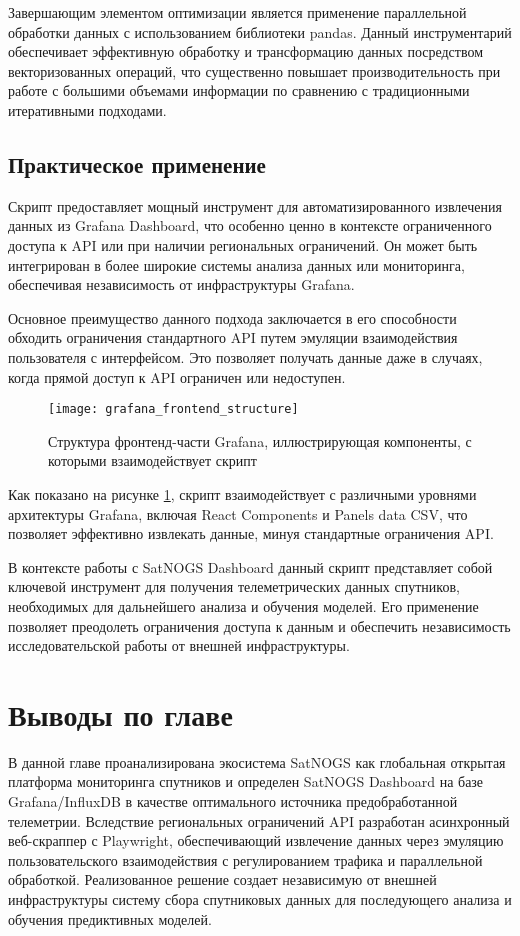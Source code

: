 Завершающим элементом оптимизации является применение параллельной обработки
данных с использованием библиотеки pandas. Данный инструментарий обеспечивает
эффективную обработку и трансформацию данных посредством векторизованных
операций, что существенно повышает производительность при работе с большими
объемами информации по сравнению с традиционными итеративными подходами.

\subsection{Практическое применение}

Скрипт предоставляет мощный инструмент для автоматизированного извлечения
данных из Grafana Dashboard, что особенно ценно в контексте ограниченного
доступа к API или при наличии региональных ограничений. Он может быть
интегрирован в более широкие системы анализа данных или мониторинга,
обеспечивая независимость от инфраструктуры Grafana.

Основное преимущество данного подхода заключается в его способности обходить
ограничения стандартного API путем эмуляции взаимодействия пользователя с
интерфейсом. Это позволяет получать данные даже в случаях, когда прямой
доступ к API ограничен или недоступен.

\begin{figure}[H]
	\centering
	\texttt{[image: grafana\_frontend\_structure]}
	\caption{Структура фронтенд-части Grafana, иллюстрирующая компоненты, с которыми взаимодействует скрипт}
	\label{fig:grafana_frontend_structure_advanced}
\end{figure}

Как показано на рисунке \ref{fig:grafana_frontend_structure_advanced}, скрипт
взаимодействует с различными уровнями архитектуры Grafana, включая React
Components и Panels data CSV, что позволяет эффективно извлекать данные, минуя
стандартные ограничения API.

В контексте работы с SatNOGS Dashboard данный скрипт представляет собой
ключевой инструмент для получения телеметрических данных спутников, необходимых
для дальнейшего анализа и обучения моделей. Его применение позволяет преодолеть
ограничения доступа к данным и обеспечить независимость исследовательской
работы от внешней инфраструктуры.

\section{Выводы по главе}

В данной главе проанализирована экосистема SatNOGS как глобальная открытая платформа мониторинга спутников и определен SatNOGS Dashboard на базе Grafana/InfluxDB в качестве оптимального источника предобработанной телеметрии. Вследствие региональных ограничений API разработан асинхронный веб-скраппер с Playwright, обеспечивающий извлечение данных через эмуляцию пользовательского взаимодействия с регулированием трафика и параллельной обработкой. Реализованное решение создает независимую от внешней инфраструктуры систему сбора спутниковых данных для последующего анализа и обучения предиктивных моделей.
